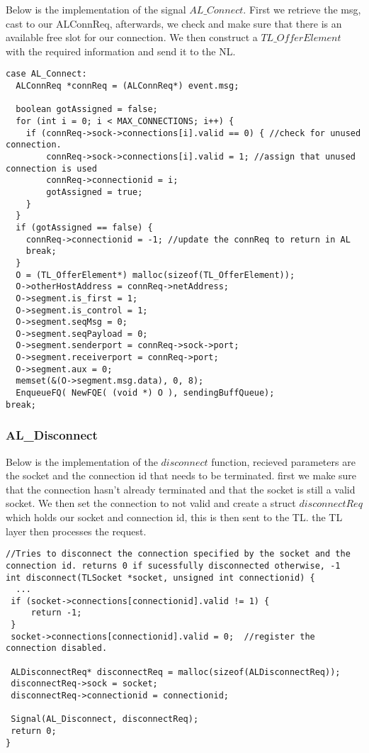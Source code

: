 Below is the implementation of the signal $AL\_Connect$.
First we retrieve the msg, cast to our ALConnReq, afterwards, we check and make sure that
there is an available free slot for our connection.
We then construct a $TL\_OfferElement$ with the required information and send it to the NL.
\begin{lstlisting}
case AL_Connect:
  ALConnReq *connReq = (ALConnReq*) event.msg;

  boolean gotAssigned = false;
  for (int i = 0; i < MAX_CONNECTIONS; i++) {
    if (connReq->sock->connections[i].valid == 0) { //check for unused connection.
        connReq->sock->connections[i].valid = 1; //assign that unused connection is used
        connReq->connectionid = i;
        gotAssigned = true;
    }
  }
  if (gotAssigned == false) {
    connReq->connectionid = -1; //update the connReq to return in AL
    break;
  }
  O = (TL_OfferElement*) malloc(sizeof(TL_OfferElement));
  O->otherHostAddress = connReq->netAddress;
  O->segment.is_first = 1;
  O->segment.is_control = 1;
  O->segment.seqMsg = 0;
  O->segment.seqPayload = 0;
  O->segment.senderport = connReq->sock->port;
  O->segment.receiverport = connReq->port;
  O->segment.aux = 0;
  memset(&(O->segment.msg.data), 0, 8);
  EnqueueFQ( NewFQE( (void *) O ), sendingBuffQueue);
break;
\end{lstlisting}



\subsubsection{AL\_Disconnect}

Below is the implementation of the $disconnect$ function, recieved parameters are the socket and the connection id that needs to be terminated.
first we make sure that the connection hasn't already terminated and that the socket is still a valid socket.
We then set the connection to not valid and create a struct $disconnectReq$ which holds our socket and connection id, this is then sent to the TL.
the TL layer then processes the request.
\begin{lstlisting}
//Tries to disconnect the connection specified by the socket and the connection id. returns 0 if sucessfully disconnected otherwise, -1
int disconnect(TLSocket *socket, unsigned int connectionid) {
  ...
 if (socket->connections[connectionid].valid != 1) {
     return -1;
 }
 socket->connections[connectionid].valid = 0;  //register the connection disabled.

 ALDisconnectReq* disconnectReq = malloc(sizeof(ALDisconnectReq));
 disconnectReq->sock = socket;
 disconnectReq->connectionid = connectionid;

 Signal(AL_Disconnect, disconnectReq);
 return 0;
}
\end{lstlisting}


